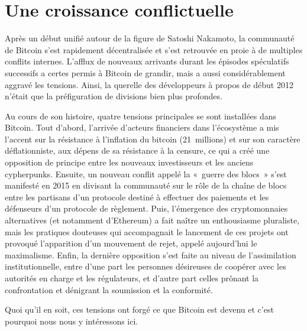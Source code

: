 
\chapter{Une croissance conflictuelle}

Après un début unifié autour de la figure de Satoshi Nakamoto, la communauté de Bitcoin s'est rapidement décentralisée et s'est retrouvée en proie à de multiples conflits internes. L'afflux de nouveaux arrivants durant les épisodes spéculatifs successifs a certes permis à Bitcoin de grandir, mais a aussi considérablement aggravé les tensions. Ainsi, la querelle des développeurs à propos de  début 2012 n'était que la préfiguration de divisions bien plus profondes.

Au cours de son histoire, quatre tensions principales se sont installées dans Bitcoin. Tout d'abord, l'arrivée d'acteurs financiers dans l'écosystème a mis l'accent sur la résistance à l'inflation du bitcoin (21~millions) et sur son caractère déflationniste, aux dépens de sa résistance à la censure, ce qui a créé une opposition de principe entre les nouveaux investisseurs et les anciens cypherpunks. Ensuite, un nouveau conflit appelé la «~guerre des blocs~» s'est manifesté en 2015 en divisant la communauté sur le rôle de la chaîne de blocs entre les partisans d'un protocole destiné à effectuer des paiements et les défenseurs d'un protocole de règlement. Puis, l'émergence des cryptomonnaies alternatives (et notamment d'Ethereum) a fait naître un enthousiasme pluraliste, mais les pratiques douteuses qui accompagnait le lancement de ces projets ont provoqué l'apparition d'un mouvement de rejet, appelé aujourd'hui le maximalisme. Enfin, la dernière opposition s'est faite au niveau de l'assimilation institutionnelle, entre d'une part les personnes désireuses de coopérer avec les autorités en charge et les régulateurs, et d'autre part celles prônant la confrontation et dénigrant la soumission et la conformité. 

Quoi qu'il en soit, ces tensions ont forgé ce que Bitcoin est devenu et c'est pourquoi nous nous y intéressons ici.


